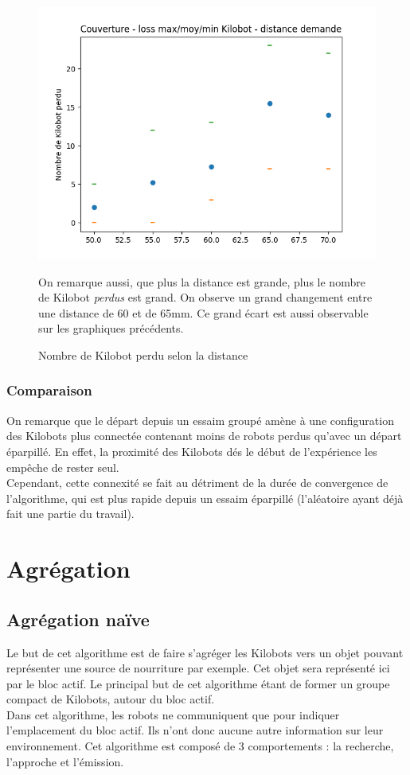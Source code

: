 \documentclass[a4paper]{article}
\begin{document}
\begin{figure}[h!]
	\begin{minipage}[c]{.46\linewidth}
		\centering
	\includegraphics[width=1.1\linewidth]{../../script_results/Couverture_loss_kilobot.png}
	\caption{Nombre de Kilobot perdu selon la distance}
	\end{minipage}
	\begin{minipage}[c]{.46\linewidth}
	On remarque aussi, que plus la distance est grande, plus le nombre de Kilobot \textit{perdus} est grand. On observe un grand changement entre une distance de 60 et de 65mm. Ce grand écart est aussi observable sur les graphiques précédents.
	\end{minipage}
\end{figure}
\newpage
\subsubsection{Comparaison}
On remarque que le départ depuis un essaim groupé amène à une configuration des Kilobots plus connectée contenant moins de robots perdus qu'avec un départ éparpillé. En effet, la proximité des Kilobots dés le début de l'expérience les empêche de rester seul.\\ Cependant, cette connexité se fait au détriment de la durée de convergence de l'algorithme, qui est plus rapide depuis un essaim éparpillé (l'aléatoire ayant déjà fait une partie du travail).
\newpage
\section{Agrégation}
\subsection{Agrégation naïve}
Le but de cet algorithme est de faire s'agréger les Kilobots vers un objet  pouvant représenter une source de nourriture par exemple. Cet objet sera représenté ici par le bloc actif. Le principal but de cet algorithme étant de former un groupe compact de Kilobots, autour du bloc actif.\\
Dans cet algorithme, les robots ne communiquent que pour indiquer l'emplacement du bloc actif. Ils n'ont donc aucune autre information sur leur environnement. Cet algorithme est composé de 3 comportements : la recherche, l'approche et l'émission.\\
\end{document}
